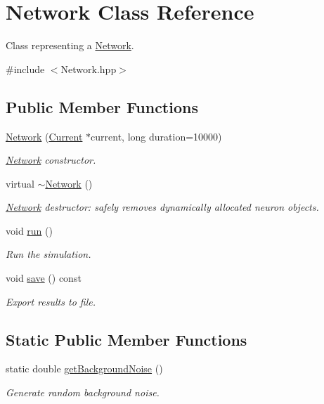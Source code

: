 \hypertarget{classNetwork}{\section{Network Class Reference}
\label{classNetwork}
}


Class representing a \hyperlink{classNetwork}{Network}.  




{\ttfamily \#include $<$Network.\-hpp$>$}

\subsection*{Public Member Functions}
\begin{DoxyCompactItemize}
\item 
\hyperlink{classNetwork_a5fcb2ec1ac92e354f01b5e1b575dd41b}{Network} (\hyperlink{classCurrent}{Current} $\ast$current, long duration=10000)
\begin{DoxyCompactList}\small\item\em \hyperlink{classNetwork}{Network} constructor. \end{DoxyCompactList}\item 
\hypertarget{classNetwork_a7a4e19cdb4bf0c7ecf82baa643831492}{virtual \hyperlink{classNetwork_a7a4e19cdb4bf0c7ecf82baa643831492}{$\sim$\-Network} ()}\label{classNetwork_a7a4e19cdb4bf0c7ecf82baa643831492}

\begin{DoxyCompactList}\small\item\em \hyperlink{classNetwork}{Network} destructor\-: safely removes dynamically allocated neuron objects. \end{DoxyCompactList}\item 
void \hyperlink{classNetwork_acc13a2e54ee332bb9f288f953ae141ed}{run} ()
\begin{DoxyCompactList}\small\item\em Run the simulation. \end{DoxyCompactList}\item 
void \hyperlink{classNetwork_a24155c20d43b4925352db52d4aab57c3}{save} () const 
\begin{DoxyCompactList}\small\item\em Export results to file. \end{DoxyCompactList}\end{DoxyCompactItemize}
\subsection*{Static Public Member Functions}
\begin{DoxyCompactItemize}
\item 
static double \hyperlink{classNetwork_a803fda977c3c164e3a26ebb630aeebc2}{get\-Background\-Noise} ()
\begin{DoxyCompactList}\small\item\em Generate random background noise. \end{DoxyCompactList}\end{DoxyCompactItemize}
